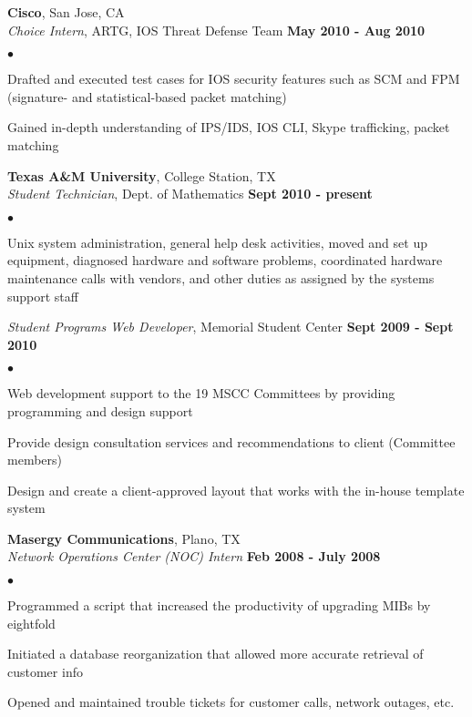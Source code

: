 \documentclass[margin,line]{res}
\newenvironment{list2}{
  \begin{list}{$\bullet$}{%
      \setlength{\itemsep}{0in}
      \setlength{\parsep}{0in} \setlength{\parskip}{0in}
      \setlength{\topsep}{0in} \setlength{\partopsep}{0in} 
      \setlength{\leftmargin}{0.18in}}}{\end{list}}
\begin{document}
\begin{resume}
{\bf Cisco}, San Jose, CA \\
{\em Choice Intern}, ARTG, IOS Threat Defense Team \hfill {\bf May 2010 - Aug 2010}\\
\vspace{-3mm}
\begin{list2}
\item Drafted and executed test cases for IOS security features such as SCM and FPM
  (signature- and statistical-based packet matching)
\item Gained in-depth understanding of IPS/IDS, IOS CLI, Skype trafficking, packet matching
\end{list2}

{\bf Texas A\&M University}, College Station, TX \\
{\em Student Technician}, Dept. of Mathematics \hfill {\bf Sept 2010 - present} \\
\vspace{-3mm}
\begin{list2}
\item Unix system administration, general help desk activities, moved and set up
  equipment, diagnosed hardware and software problems, coordinated hardware maintenance
  calls with vendors, and other duties as assigned by the systems support staff
\end{list2}

{\em Student Programs Web Developer}, Memorial Student Center \hfill {\bf Sept 2009 - Sept 2010} \\
\vspace{-3mm}
\begin{list2}
\item Web development support to the 19 MSCC Committees by providing programming and design support
\item Provide design consultation services and recommendations to client (Committee members)
\item Design and create a client-approved layout that works with the in-house template system
\end{list2}

{\bf Masergy Communications}, Plano, TX \\
{\em Network Operations Center (NOC) Intern} \hfill {\bf Feb 2008 - July 2008} \\
\vspace{-3mm}
\begin{list2}
\item Programmed a script that increased the productivity of upgrading MIBs by eightfold
\item Initiated a database reorganization that allowed more accurate retrieval of customer info
\item Opened and maintained trouble tickets for customer calls, network outages, etc.
\end{list2}


\end{resume}
\end{document}
